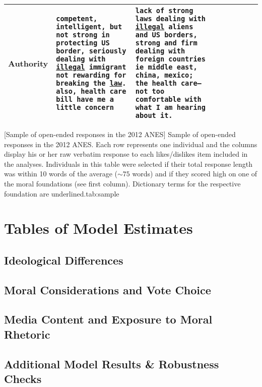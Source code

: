 {\begin{tabular}{ | l | p{2.1cm} | p{2.1cm} | p{2.1cm} | p{2.1cm} | p{2.1cm} | p{2.1cm} | p{2.1cm} | p{2.1cm} | }
    	Authority & \texttt{competent, intelligent, but not strong in protecting US border, seriously dealing with \underline{illegal} immigrant not rewarding for breaking the \underline{law}. also, health care bill have me a little concern} & \texttt{lack of strong laws dealing with \underline{illegal} aliens and US borders, strong and firm dealing with foreign countries ie middle east, china, mexico; the health care--not too comfortable with what I am hearing about it.} &  &  &  &  &  &  \\ \hline
    \end{tabular}
}[Sample of open-ended responses in the 2012 ANES]{%
Sample of open-ended responses in the 2012 ANES. Each row represents one individual and the columns display his or her raw verbatim response to each likes/dislikes item included in the analyses. Individuals in this table were selected if their total response length was within 10 words of the average ($\sim75$ words) and if they scored high on one of the moral foundations (see first column). Dictionary terms for the respective foundation are underlined.}{tab:sample}


\clearpage
\section{Tables of Model Estimates}\label{app:tables}


\subsection{Ideological Differences}


\clearpage
\subsection{Moral Considerations and Vote Choice}


\clearpage
\subsection{Media Content and Exposure to Moral Rhetoric}


\clearpage
\subsection{Additional Model Results \& Robustness Checks}

